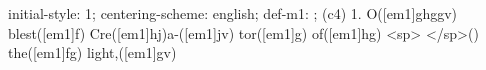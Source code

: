 initial-style: 1;
centering-scheme: english;
def-m1: \grealign;
(c4) 1. O([em1]ghggv) blest([em1]f) Cre([em1]hj)a-([em1]jv) tor([em1]g) of([em1]hg) <sp> </sp>() the([em1]fg) light,([em1]gv)